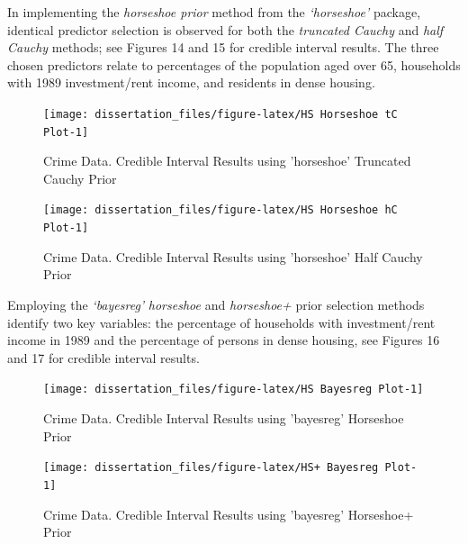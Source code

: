 \documentclass[
  11pt,
]{article}
\begin{document}
In implementing the \emph{horseshoe prior} method from the
\emph{`horseshoe'} package, identical predictor selection is observed
for both the \emph{truncated Cauchy} and \emph{half Cauchy} methods; see
Figures 14 and 15 for credible interval results. The three chosen
predictors relate to percentages of the population aged over 65,
households with 1989 investment/rent income, and residents in dense
housing.

\begin{figure}[H]

{\centering \texttt{[image: dissertation\_files/figure-latex/HS Horseshoe tC Plot-1]} 

}

\caption{Crime Data. Credible Interval Results using 'horseshoe' Truncated Cauchy Prior}\label{fig:HS Horseshoe tC Plot}
\end{figure}

\begin{figure}[H]

{\centering \texttt{[image: dissertation\_files/figure-latex/HS Horseshoe hC Plot-1]} 

}

\caption{Crime Data. Credible Interval Results using 'horseshoe' Half Cauchy Prior}\label{fig:HS Horseshoe hC Plot}
\end{figure}

Employing the \emph{`bayesreg'} \emph{horseshoe} and \emph{horseshoe+}
prior selection methods identify two key variables: the percentage of
households with investment/rent income in 1989 and the percentage of
persons in dense housing, see Figures 16 and 17 for credible interval
results.

\begin{figure}[H]

{\centering \texttt{[image: dissertation\_files/figure-latex/HS Bayesreg Plot-1]} 

}

\caption{Crime Data. Credible Interval Results using 'bayesreg' Horseshoe Prior}\label{fig:HS Bayesreg Plot}
\end{figure}

\begin{figure}[H]

{\centering \texttt{[image: dissertation\_files/figure-latex/HS+ Bayesreg Plot-1]} 

}

\caption{Crime Data. Credible Interval Results using 'bayesreg' Horseshoe+ Prior}\label{fig:HS+ Bayesreg Plot}
\end{figure}
\end{document}
